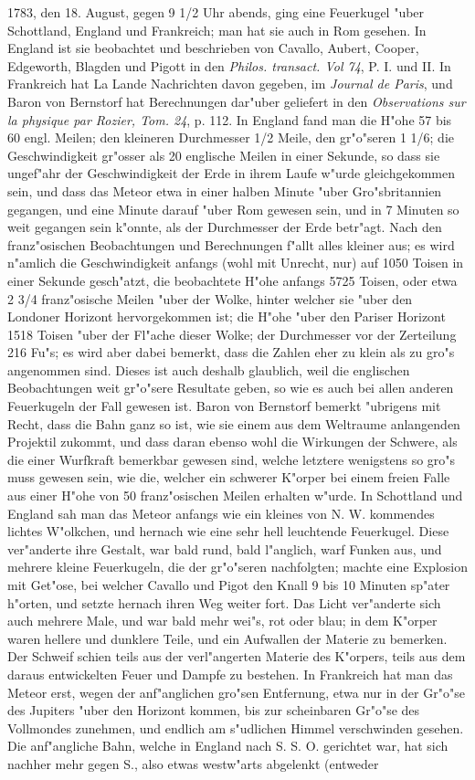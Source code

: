 \documentclass[a4paper, 11pt, oneside, polutonikogreek, german]{article}
\begin{document}
1783, den 18. August, gegen 9 1/2 Uhr abends, ging eine Feuerkugel "uber Schottland, England und Frankreich; man hat sie auch in Rom gesehen. In England ist sie beobachtet und beschrieben von Cavallo, Aubert, Cooper, Edgeworth, Blagden und Pigott in den \emph{Philos. transact. Vol 74}, P. I. und II. In Frankreich hat La Lande Nachrichten davon gegeben, im \emph{Journal de Paris}, und Baron von Bernstorf hat Berechnungen dar"uber geliefert in den \emph{Observations sur la physique par Rozier, Tom. 24}, p. 112. In England fand man die H"ohe 57 bis 60 engl. Meilen; den kleineren Durchmesser 1/2 Meile, den gr"o"seren 1 1/6; die Geschwindigkeit gr"osser als 20 englische Meilen in einer Sekunde, so dass sie ungef"ahr der Geschwindigkeit der Erde in ihrem Laufe w"urde gleichgekommen sein, und dass das Meteor etwa in einer halben Minute "uber Gro"sbritannien gegangen, und eine Minute darauf "uber Rom gewesen sein, und in 7 Minuten so weit gegangen sein k"onnte, als der Durchmesser der Erde betr"agt. Nach den franz"osischen Beobachtungen und Berechnungen f"allt alles kleiner aus; es wird n"amlich die Geschwindigkeit anfangs (wohl mit Unrecht, nur) auf 1050 Toisen in einer Sekunde gesch"atzt, die beobachtete H"ohe anfangs 5725 Toisen, oder etwa 2 3/4 franz"osische Meilen "uber der Wolke, hinter welcher sie "uber den Londoner Horizont hervorgekommen ist; die H"ohe "uber den Pariser Horizont 1518 Toisen "uber der Fl"ache dieser Wolke; der Durchmesser vor der Zerteilung 216 Fu"s; es wird aber dabei bemerkt, dass die Zahlen eher zu klein als zu gro"s angenommen sind. Dieses ist auch deshalb glaublich, weil die englischen Beobachtungen weit gr"o"sere Resultate geben, so wie es auch bei allen anderen Feuerkugeln der Fall gewesen ist. Baron von Bernstorf bemerkt "ubrigens mit Recht, dass die Bahn ganz so ist, wie sie einem aus dem Weltraume anlangenden Projektil zukommt, und dass daran ebenso wohl die Wirkungen der Schwere, als die einer Wurfkraft bemerkbar gewesen sind, welche letztere wenigstens so gro"s muss gewesen sein, wie die, welcher ein schwerer K"orper bei einem freien Falle aus einer H"ohe von 50 franz"osischen Meilen erhalten w"urde. In Schottland und England sah man das Meteor anfangs wie ein kleines von N. W. kommendes lichtes W"olkchen, und hernach wie eine sehr hell leuchtende Feuerkugel. Diese ver"anderte ihre Gestalt, war bald rund, bald l"anglich, warf Funken aus, und mehrere kleine Feuerkugeln, die der gr"o"seren nachfolgten; machte eine Explosion mit Get"ose, bei welcher Cavallo und Pigot den Knall 9 bis 10 Minuten sp"ater h"orten, und setzte hernach ihren Weg weiter fort. Das Licht ver"anderte sich auch mehrere Male, und war bald mehr wei"s, rot oder blau; in dem K"orper waren hellere und dunklere Teile, und ein Aufwallen der Materie zu bemerken. Der Schweif schien teils aus der verl"angerten Materie des K"orpers, teils aus dem daraus entwickelten Feuer und Dampfe zu bestehen. In Frankreich hat man das Meteor erst, wegen der anf"anglichen gro"sen Entfernung, etwa nur in der Gr"o"se des Jupiters "uber den Horizont kommen, bis zur scheinbaren Gr"o"se des Vollmondes zunehmen, und endlich am s"udlichen Himmel verschwinden gesehen. Die anf"angliche Bahn, welche in England nach S. S. O. gerichtet war, hat sich nachher mehr gegen S., also etwas westw"arts abgelenkt (entweder 
\end{document}
